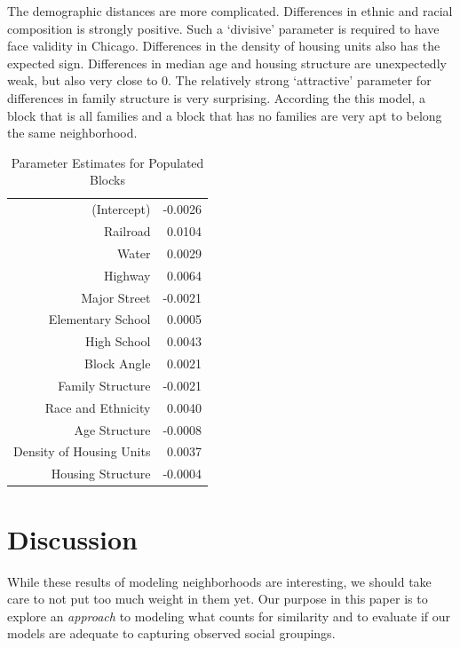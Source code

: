 \documentclass[12pt,letter]{article}\usepackage[]{graphicx}\usepackage[]{color}
\begin{document}
The demographic distances are more complicated. Differences in ethnic
and racial composition is strongly positive. Such a `divisive'
parameter is required to have face validity in Chicago. Differences in
the density of housing units also has the expected sign. Differences
in median age and housing structure are unexpectedly weak, but also
very close to 0. The relatively strong `attractive' parameter for
differences in family structure is very surprising. According the this
model, a block that is all families and a block that has no families
are very apt to belong the same neighborhood. 

\begin{table}[ht]
\centering
\begin{tabular}{rr}
  \hline
 &  \\ 
  \hline
(Intercept) & -0.0026 \\ 
  Railroad & 0.0104 \\ 
  Water & 0.0029 \\ 
  Highway & 0.0064 \\ 
  Major Street & -0.0021 \\ 
  Elementary School & 0.0005 \\ 
  High School & 0.0043 \\ 
  Block Angle & 0.0021 \\ 
  Family Structure & -0.0021 \\ 
  Race and Ethnicity & 0.0040 \\ 
  Age Structure & -0.0008 \\ 
  Density of Housing Units & 0.0037 \\ 
  Housing Structure & -0.0004 \\ 
   \hline
\end{tabular}
\caption{Parameter Estimates for Populated Blocks} 
\label{tab:parameters}
\end{table}



\section*{Discussion}
While these results of modeling neighborhoods are interesting, we
should take care to not put too much weight in them yet. Our purpose
in this paper is to explore an \emph{approach} to modeling what counts
for similarity and to evaluate if our models are adequate to capturing
observed social groupings. 
\end{document}

